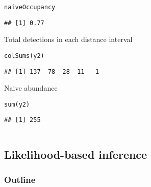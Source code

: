 \documentclass[color=usenames,dvipsnames]{beamer}\usepackage[]{graphicx}\usepackage[]{color}
\makeatletter
\newcommand{\hlstd}[1]{\textcolor[rgb]{0,0,0}{#1}}%
\newcommand{\hlkwd}[1]{\textcolor[rgb]{0.004,0.004,0.506}{#1}}%
\newenvironment{kframe}{%
 \def\at@end@of@kframe{}%
 \ifinner\ifhmode%
  \def\at@end@of@kframe{\end{minipage}}%
  \begin{minipage}{\columnwidth}%
 \fi\fi%
 \def\FrameCommand##1{\hskip\@totalleftmargin \hskip-\fboxsep
 \colorbox{shadecolor}{##1}\hskip-\fboxsep
     \hskip-\linewidth \hskip-\@totalleftmargin \hskip\columnwidth}%
 \MakeFramed {\advance\hsize-\width
   \@totalleftmargin\z@ \linewidth\hsize
   \@setminipage}}%
 {\par\unskip\endMakeFramed%
 \at@end@of@kframe}
\newenvironment{knitrout}{}{} %
\makeatother
\begin{document}
\begin{frame}[fragile]
\begin{columns}
\begin{column}{0.6\textwidth}
\begin{knitrout}
\begin{kframe}
\begin{alltt}
\hlstd{naiveOccupancy}
\end{alltt}
\begin{verbatim}
## [1] 0.77
\end{verbatim}
\end{kframe}
\end{knitrout}
  \pause
  \vfill
  \small
  Total detections in each distance interval
  \vspace{-6pt}
\begin{knitrout}\scriptsize
{}\color{fgcolor}\begin{kframe}
\begin{alltt}
\hlkwd{colSums}\hlstd{(y2)}
\end{alltt}
\begin{verbatim}
## [1] 137  78  28  11   1
\end{verbatim}
\end{kframe}
\end{knitrout}
  \pause
  \vfill
  Naive abundance
  \vspace{-6pt}
\begin{knitrout}\scriptsize
{}\color{fgcolor}\begin{kframe}
\begin{alltt}
\hlkwd{sum}\hlstd{(y2)}
\end{alltt}
\begin{verbatim}
## [1] 255
\end{verbatim}
\end{kframe}
\end{knitrout}

  \end{column}
  \end{columns}
\end{frame}






\subsection{Likelihood-based inference}


\begin{frame}
  \frametitle{Outline}
  \Large
  \tableofcontents[currentsection]
\end{frame}
\end{document}
